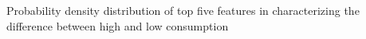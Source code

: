 Probability density distribution of top five features in characterizing the difference between high and low consumption
\label{fig:topfivefeatures_highvslow}